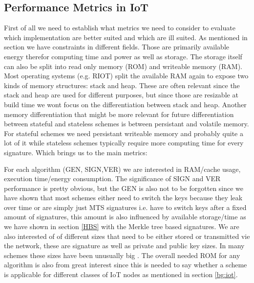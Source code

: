 \documentclass[conference]{IEEEtran}
\newcommand{\comment}[1]{}
\begin{document}
\subsection{Performance Metrics in IoT}
\comment{ %

'' small sized public key, small digital signature and a range of supported hash output sizes is recommended''\cite{QR_Iot_Lattice}

- „signature and/or key sizes to running times and memory consumption to energy consumption „
- „From the software benchmark perspec- tive, the runtime of key generation, signing, and verification processes whereas from the hardware perspective, CPU cycles, key size, signature size, and energy consumption are among the targeted evaluation metrics. In general, the parameter sets are highly dependent on the underlying construction of a particular scheme.“ \cite{QR_sigs}

} %

First of all we need to establish what metrics we need to consider to evaluate which implementation are better suited and which are ill suited.
As mentioned in section \label{bg:iot} we have constraints in different fields. Those are primarily available energy therefor computing time and power as well as storage.
The storage itself can also be split into read only memory (ROM) and writeable memory (RAM).
Most operating systems (e.g. RIOT) split the available RAM again to expose two kinds of memory structures: stack and heap. These are often relevant since the stack and heap are used for different purposes, but since those are resizable at build time we wont focus on the differentiation between stack and heap.
Another memory differentiation that might be more relevant for future differentiation between stateful and stateless schemes is between persistant and volatile memory. 
For stateful schemes we need persistant writeable memory and probably quite a lot of it while stateless schemes typically require more computing time for every signature. Which brings us to the main metrics:

For each algorithm (GEN, SIGN,VER) we are interested in RAM/cache usage, execution time/energy consumption.
The significance of SIGN and VER performance is pretty obvious, but the GEN is also not to be forgotten since we have shown that most schemes either need to switch the keys because they leak over time or are simply just MTS signatures i.e. have to switch keys after a fixed amount of signatures, this amount is also influenced by available storage/time as we have shown in section \ref{HBS} with the Merkle tree based signatures.
We are also interested of of different sizes that need to be either stored or transmitted vie the network, these are signature as well as private and public key sizes. In many schemes these sizes have been unusually big \cite{QR_comparison}.
The overall needed ROM for any algorithm is also from great interest since this is needed to say whether a scheme is applicable for different classes of IoT nodes as mentioned in section \ref{bg:iot}.
\end{document}
